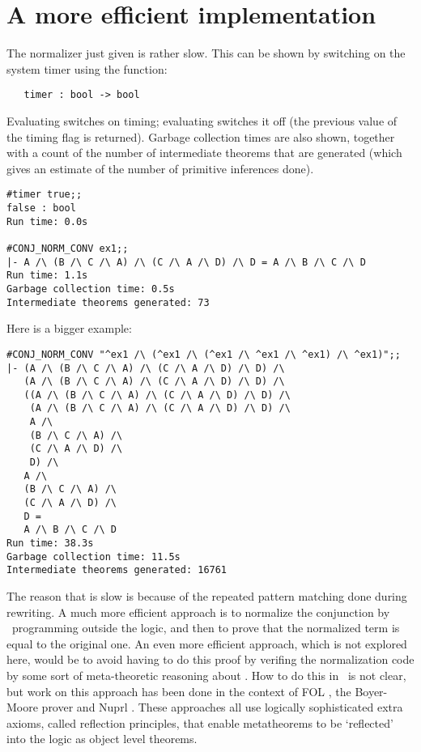 \section{A more efficient implementation}

The normalizer just given is rather slow. This can be shown by switching on the
system timer using the function:

\begin{hol}\begin{verbatim}
   timer : bool -> bool
\end{verbatim}\end{hol}

\noindent Evaluating  switches on timing; evaluating
 switches it off (the previous value of the timing flag
is returned). Garbage collection times are also shown, together with a
count of the number of intermediate theorems that are generated (which
gives an estimate of the number of primitive inferences done).

\begin{session}\begin{verbatim}
#timer true;;
false : bool
Run time: 0.0s

#CONJ_NORM_CONV ex1;;
|- A /\ (B /\ C /\ A) /\ (C /\ A /\ D) /\ D = A /\ B /\ C /\ D
Run time: 1.1s
Garbage collection time: 0.5s
Intermediate theorems generated: 73
\end{verbatim}\end{session}

\noindent Here is a bigger example:

\begin{session}\begin{verbatim}
#CONJ_NORM_CONV "^ex1 /\ (^ex1 /\ (^ex1 /\ ^ex1 /\ ^ex1) /\ ^ex1)";;
|- (A /\ (B /\ C /\ A) /\ (C /\ A /\ D) /\ D) /\
   (A /\ (B /\ C /\ A) /\ (C /\ A /\ D) /\ D) /\
   ((A /\ (B /\ C /\ A) /\ (C /\ A /\ D) /\ D) /\
    (A /\ (B /\ C /\ A) /\ (C /\ A /\ D) /\ D) /\
    A /\
    (B /\ C /\ A) /\
    (C /\ A /\ D) /\
    D) /\
   A /\
   (B /\ C /\ A) /\
   (C /\ A /\ D) /\
   D =
   A /\ B /\ C /\ D
Run time: 38.3s
Garbage collection time: 11.5s
Intermediate theorems generated: 16761
\end{verbatim}\end{session}

The reason that  is slow is because of the
repeated pattern matching done during rewriting. A much more efficient
approach is to normalize the conjunction by \ML\ programming outside
the logic, and then to prove that the normalized term is equal to the
original one. An even more efficient approach, which is not explored
here, would be to avoid having to do this proof by verifing the
normalization code by some sort of meta-theoretic
reasoning about \ML. How to do this in
\HOL\ is not clear, but work on this approach has been done in the
context of {\small FOL} \cite{FOL}, the Boyer-Moore prover \cite{BoyerMoore}
and Nuprl \cite{Nuprl}. These approaches all use logically
sophisticated extra axioms, called reflection principles, that enable
metatheorems to be `reflected' into the logic as object level
theorems.

